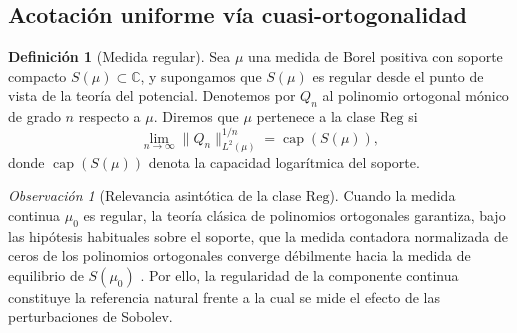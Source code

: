 \documentclass[12pt,a4paper]{article}
\theoremstyle{definition}
\newtheorem{definition}{Definición}
\theoremstyle{remark}
\newtheorem{remark}{Observación}
\begin{document}
\subsection{Acotación uniforme vía cuasi-ortogonalidad}\label{sec:cuasi_ortogonalidad}

\begin{definition}[Medida regular]
  Sea $\mu$ una medida de Borel positiva con soporte compacto $S(\mu) \subset \mathbb{C}$, y supongamos que $S(\mu)$ es regular desde el punto de vista de la teoría del potencial. Denotemos por $Q_n$ al polinomio ortogonal mónico de grado $n$ respecto a $\mu$. Diremos que $\mu$ pertenece a la clase $\mathrm{Reg}$ si
  \begin{equation}
    \lim_{n \to \infty} \|Q_n\|_{L^2(\mu)}^{1/n} = \operatorname{cap}(S(\mu)),
  \end{equation}
  donde $\operatorname{cap}(S(\mu))$ denota la capacidad logarítmica del soporte.
\end{definition}

\begin{remark}[Relevancia asintótica de la clase $\mathrm{Reg}$]
  Cuando la medida continua $\mu_0$ es regular, la teoría clásica de polinomios ortogonales garantiza, bajo las hipótesis habituales sobre el soporte, que la medida contadora normalizada de ceros de los polinomios ortogonales converge débilmente hacia la medida de equilibrio de $S(\mu_0)$ \cite{stahl1992general}. Por ello, la regularidad de la componente continua constituye la referencia natural frente a la cual se mide el efecto de las perturbaciones de Sobolev.
\end{remark}
\end{document}
